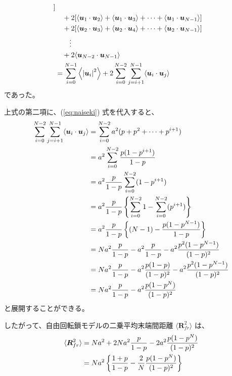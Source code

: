 \documentclass[uplatex,dvipdfmx,a4paper,11pt, titlepage]{jsarticle}
\begin{document}
\begin{appendix}
\begin{align*}
			] \notag \\
		&\quad+ 
			2[ 
			\langle \bm{u}_1 \cdot \bm{u}_2 \rangle +\langle \bm{u}_1 \cdot \bm{u}_3 \rangle + \cdots + \langle \bm{u}_1 \cdot \bm{u}_{N-1} \rangle 
			] \notag \\
		&\quad+ 
			2[ 
			\langle \bm{u}_2 \cdot \bm{u}_3 \rangle +\langle \bm{u}_2 \cdot \bm{u}_4 \rangle + \cdots + \langle \bm{u}_2 \cdot \bm{u}_{N-1} \rangle 
			] \notag \\
		&\quad\quad \vdots \notag \\
		&\quad+ 
			2\langle \bm{u}_{N-2} \cdot \bm{u}_{N-1} \rangle
			\notag \\
%
%
		&= \sum_{i=0}^{N-1} \left \langle \left| \bm{u}_{i} \right|^2 \right\rangle + 2 \sum_{i=0}^{N-2} \sum_{j=i+1}^{N-1} \langle \bm{u}_i \cdot \bm{u}_j \rangle
\end{align*}
であった。

上式の第二項に、(\ref{eq:naiseki}) 式を代入すると、
\begin{align*}
\sum_{i=0}^{N-2} \sum_{j=i+1}^{N-1} \langle \bm{u}_i \cdot \bm{u}_j \rangle 
	&= \sum_{i=0}^{N-2} a^2 (p + p^2 + \cdots + p^{i+1} ) \notag \\
	&= a^2 \sum_{i=0}^{N-2}  \dfrac{p(1-p^{i+1})}{1-p} \notag \\
	&= a^2 \dfrac{p}{1-p} \sum_{i=0}^{N-2}  (1-p^{i+1}) \notag \\
	&= a^2 \dfrac{p}{1-p} \left \{ \sum_{i=0}^{N-2} 1 - \sum_{i=0}^{N-2} (p^{i+1}) \right \} \notag \\
	&= a^2 \dfrac{p}{1-p} \left\{ (N-1) - \dfrac{p(1-p^{N-1})}{1-p} \right \} \notag \\
	&= Na^2 \dfrac{p}{1-p} - a^2 \dfrac{p}{1-p} - a^2 \dfrac{p^2(1-p^{N-1})}{(1-p)^2} \notag \\
	&= Na^2 \dfrac{p}{1-p} - a^2 \dfrac{p(1-p)}{(1-p)^2} - a^2 \dfrac{p^2(1-p^{N-1})}{(1-p)^2} \notag \\
	&= Na^2 \dfrac{p}{1-p} - a^2 \dfrac{p(1-p^{N})}{(1-p)^2}
\end{align*}
と展開することができる。

したがって、自由回転鎖モデルの二乗平均末端間距離 $\langle \bm{R}_{fr}^2 \rangle$ は、
\begin{align*}
	\langle \bm{R}_{fr}^2 \rangle
		&= N a^2 + 2Na^2 \dfrac{p}{1-p} -2a^2 \dfrac{p(1-p^{N})}{(1-p)^2} \notag \\
		&= N a^2 \left \{ \dfrac{1+p}{1-p} - \dfrac{2}{N} \dfrac{p(1-p^{N})}{(1-p)^2} \right \}
\end{align*}


\end{appendix}
\end{document}
